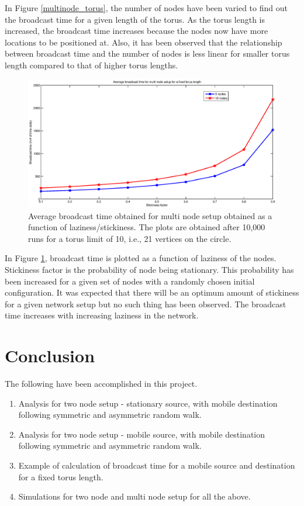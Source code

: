 \documentclass[a4paper,10pt,english]{article}
\begin{document}
In Figure \ref{multinode_torus}, the number of nodes have been varied to find out the broadcast time for a given length of the torus. As the torus length is increased, the broadcast time increases because the nodes now have more locations to be positioned at. Also, it has been observed that the relationship between broadcast time and the number of nodes is less linear for smaller torus length compared to that of higher torus lengths.

\begin{figure}[!h]
	\begin{center}
		\includegraphics[scale = 0.5]{sticky_comp.eps}
		\caption{Average broadcast time obtained for multi node setup obtained as a function of laziness/stickiness. The plots are obtained after 10,000 runs for a torus limit of 10, i.e., 21 vertices on the circle.}
		\label{stickiness}
	\end{center}
\end{figure}

In Figure \ref{stickiness}, broadcast time is plotted as a function of laziness of the nodes. Stickiness factor is the probability of node being stationary. This probability has been increased for a given set of nodes with a randomly chosen initial configuration. It was expected that there will be an optimum amount of stickiness for a given network setup but no such thing has been observed. The broadcast time increases with increasing laziness in the network.  
\FloatBarrier


\section{Conclusion}\label{concl}
The following have been accomplished in this project.
\begin{enumerate}
	\item Analysis for two node setup - stationary source, with mobile destination following symmetric and asymmetric random walk.
	\item Analysis for two node setup - mobile source, with mobile destination following symmetric and asymmetric random walk.
	\item Example of calculation of broadcast time for a mobile source and destination for a fixed torus length.
	\item Simulations for two node and multi node setup for all the above.
\end{enumerate}
\end{document}
